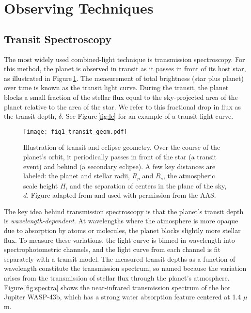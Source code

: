 \documentclass[graybox,natbib,nosecnum]{svmult}
\begin{document}

\section{Observing Techniques} 

\subsection{Transit Spectroscopy}
The most widely used combined-light technique is transmission spectroscopy. For this method, the planet is observed in transit as it passes in front of its host star, as illustrated in Figure\,\ref{fig:geom}.  The measurement of total brightness (star plus planet) over time is known as the transit light curve.  During the transit, the planet blocks a small fraction of the stellar flux equal to the sky-projected area of the planet relative to the area of the star. We refer to this fractional drop in flux as the transit depth, $\delta$. See Figure\,\ref{fig:lc} for an example of a transit light curve.

\begin{figure}
\begin{centering}
\texttt{[image: fig1\_transit\_geom.pdf]}
\caption{Illustration of transit and eclipse geometry. Over the course of the planet's orbit, it periodically passes in front of the star (a transit event) and behind (a secondary eclipse). A few key distances are labeled: the planet and stellar radii, $R_p$ and $R_s$, the atmospheric scale height $H$, and the separation of centers in the plane of the sky, $d$. Figure adapted from \citealt{robinson17} and used with permission from the AAS.}
\label{fig:geom}       
\end{centering}
\end{figure}

The key idea behind transmission spectroscopy is that the planet's transit depth is \emph{wavelength-dependent}.  At wavelengths where the atmosphere is more opaque due to absorption by atoms or molecules, the planet blocks slightly more stellar flux.  To measure these variations, the light curve is binned in wavelength into spectrophotometric channels, and the light curve from each channel is fit separately with a transit model.  The measured transit depths as a function of wavelength constitute the transmission spectrum, so named because the variation arises from the transmission of stellar flux through the planet's atmosphere. Figure\,\ref{fig:spectra} shows the near-infrared transmission spectrum of the hot Jupiter WASP-43b, which has a strong water absorption feature centered at 1.4 $\mu$m. 
 
\end{document}
